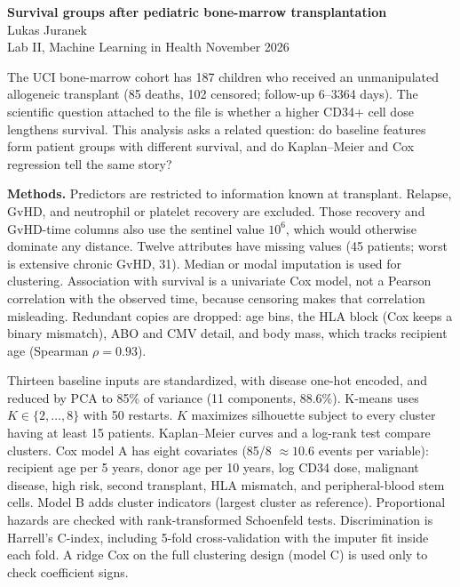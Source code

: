 \documentclass[10pt,a4paper]{article}
\begin{document}
\begin{center}
{\large\bfseries Survival groups after pediatric bone-marrow transplantation}\\[0.15em]
Lukas Juranek\\[0.1em]
{\footnotesize Lab II, Machine Learning in Health \quad November 2026}
\end{center}
\vspace{-0.35em}

\noindent
The UCI bone-marrow cohort has 187 children who received an unmanipulated allogeneic transplant (85 deaths, 102 censored; follow-up 6--3364 days). The scientific question attached to the file is whether a higher CD34+ cell dose lengthens survival. This analysis asks a related question: do baseline features form patient groups with different survival, and do Kaplan--Meier and Cox regression tell the same story?

\textbf{Methods.}
Predictors are restricted to information known at transplant. Relapse, GvHD, and neutrophil or platelet recovery are excluded. Those recovery and GvHD-time columns also use the sentinel value \(10^6\), which would otherwise dominate any distance. Twelve attributes have missing values (45 patients; worst is extensive chronic GvHD, 31). Median or modal imputation is used for clustering. Association with survival is a univariate Cox model, not a Pearson correlation with the observed time, because censoring makes that correlation misleading. Redundant copies are dropped: age bins, the HLA block (Cox keeps a binary mismatch), ABO and CMV detail, and body mass, which tracks recipient age (Spearman \(\rho=0.93\)).

Thirteen baseline inputs are standardized, with disease one-hot encoded, and reduced by PCA to 85\% of variance (11 components, 88.6\%). K-means uses \(K\in\{2,\ldots,8\}\) with 50 restarts. \(K\) maximizes silhouette subject to every cluster having at least 15 patients. Kaplan--Meier curves and a log-rank test compare clusters. Cox model A has eight covariates (85/8 \(\approx 10.6\) events per variable): recipient age per 5 years, donor age per 10 years, log CD34 dose, malignant disease, high risk, second transplant, HLA mismatch, and peripheral-blood stem cells. Model B adds cluster indicators (largest cluster as reference). Proportional hazards are checked with rank-transformed Schoenfeld tests. Discrimination is Harrell's C-index, including 5-fold cross-validation with the imputer fit inside each fold. A ridge Cox on the full clustering design (model C) is used only to check coefficient signs.
\end{document}
